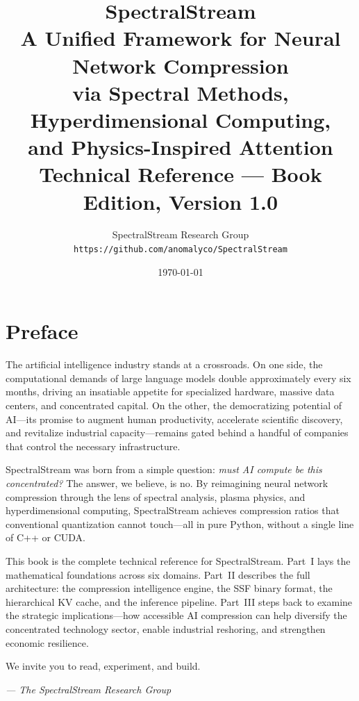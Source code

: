 \documentclass[11pt,a4paper,openright]{book}
\title{\vspace{-1in}%
  {\Huge \textbf{SpectralStream}} \\[0.5em]
  {\LARGE A Unified Framework for Neural Network Compression\\
  via Spectral Methods, Hyperdimensional Computing,\\
  and Physics-Inspired Attention} \\[1.5em]
  {\large Technical Reference --- Book Edition, Version 1.0}%
  \vspace{1em}}
\author{%
  SpectralStream Research Group \\
  \texttt{https://github.com/anomalyco/SpectralStream}%
}
\date{\today}
\begin{document}

\frontmatter
\maketitle
\cleardoublepage

\tableofcontents
\cleardoublepage

\chapter*{Preface}

The artificial intelligence industry stands at a crossroads. On one side, the computational demands of large language models double approximately every six months, driving an insatiable appetite for specialized hardware, massive data centers, and concentrated capital. On the other, the democratizing potential of AI---its promise to augment human productivity, accelerate scientific discovery, and revitalize industrial capacity---remains gated behind a handful of companies that control the necessary infrastructure.

SpectralStream was born from a simple question: \emph{must AI compute be this concentrated?} The answer, we believe, is no. By reimagining neural network compression through the lens of spectral analysis, plasma physics, and hyperdimensional computing, SpectralStream achieves compression ratios that conventional quantization cannot touch---all in pure Python, without a single line of C++ or CUDA.

This book is the complete technical reference for SpectralStream. Part~I lays the mathematical foundations across six domains. Part~II describes the full architecture: the compression intelligence engine, the SSF binary format, the hierarchical KV cache, and the inference pipeline. Part~III steps back to examine the strategic implications---how accessible AI compression can help diversify the concentrated technology sector, enable industrial reshoring, and strengthen economic resilience.

We invite you to read, experiment, and build.

\vspace{1em}
\noindent\textit{--- The SpectralStream Research Group}
\end{document}
